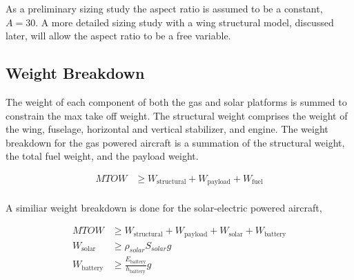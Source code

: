 \documentclass[]{aiaa-tc}%
\begin{document}
As a preliminary sizing study the aspect ratio is assumed to be a constant, $A = 30$.  A more detailed sizing study with a wing structural model, discussed later, will allow the aspect ratio to be a free variable. 

\subsection{Weight Breakdown}

The weight of each component of both the gas and solar platforms is summed to constrain the max take off weight.  
The structural weight comprises the weight of the wing, fuselage, horizontal and vertical stabilizer, and engine. 
The weight breakdown for the gas powered aircraft is a summation of the structural weight, the total fuel weight, and the payload weight. 

\begin{align}
    \label{e:weightmtow}
    MTOW &\geq W_{\text{structural}}  + W_{\text{payload}} + W_{\text{fuel}} \\
\end{align}

A similiar weight breakdown is done for the solar-electric powered aircraft, 

\begin{align}
    \label{e:weightsmtow}
    MTOW &\geq W_{\text{structural}} + W_{\text{payload}} + W_{\text{solar}} + W_{\text{battery}} \\
    W_{\text{solar}} &\geq \rho_{solar} S_{solar} g \\
    W_{\text{battery}} &\geq \frac{E_{\text{battery}}}{h_{\text{battery}}} g
\end{align}
\end{document}
